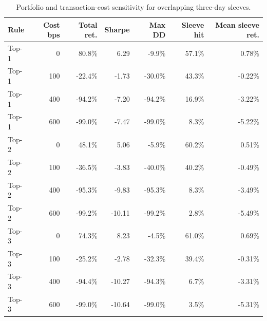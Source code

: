 \begin{table}[t]
\centering
\caption{Portfolio and transaction-cost sensitivity for overlapping three-day sleeves.}
\label{tab:portfolio}
\small
\begin{tabular}{@{}lrrrrrr@{}}
\toprule
Rule & Cost bps & Total ret. & Sharpe & Max DD & Sleeve hit & Mean sleeve ret. \\
\midrule
Top-1 & 0 & 80.8\% & 6.29 & -9.9\% & 57.1\% & 0.78\% \\
Top-1 & 100 & -22.4\% & -1.73 & -30.0\% & 43.3\% & -0.22\% \\
Top-1 & 400 & -94.2\% & -7.20 & -94.2\% & 16.9\% & -3.22\% \\
Top-1 & 600 & -99.0\% & -7.47 & -99.0\% & 8.3\% & -5.22\% \\
Top-2 & 0 & 48.1\% & 5.06 & -5.9\% & 60.2\% & 0.51\% \\
Top-2 & 100 & -36.5\% & -3.83 & -40.0\% & 40.2\% & -0.49\% \\
Top-2 & 400 & -95.3\% & -9.83 & -95.3\% & 8.3\% & -3.49\% \\
Top-2 & 600 & -99.2\% & -10.11 & -99.2\% & 2.8\% & -5.49\% \\
Top-3 & 0 & 74.3\% & 8.23 & -4.5\% & 61.0\% & 0.69\% \\
Top-3 & 100 & -25.2\% & -2.78 & -32.3\% & 39.4\% & -0.31\% \\
Top-3 & 400 & -94.4\% & -10.27 & -94.3\% & 6.7\% & -3.31\% \\
Top-3 & 600 & -99.0\% & -10.64 & -99.0\% & 3.5\% & -5.31\% \\
\bottomrule
\end{tabular}
\end{table}
